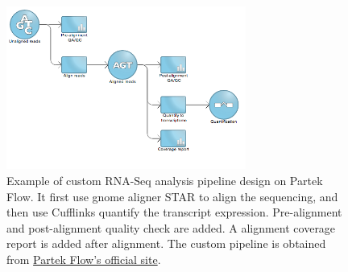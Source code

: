 \begin{figure}[!htbp]
\centering
\includegraphics[width=0.7\textwidth]{images/partek_flow_pipeline}
\caption[Example of custom pipeline design on Partek Flow]{
    Example of custom RNA-Seq analysis pipeline design on Partek Flow. It first
    use gnome aligner STAR to align the sequencing, and then use Cufflinks
    quantify the transcript expression. Pre-alignment and post-alignment
    quality check are added. A alignment coverage report is added after
    alignment. The custom pipeline is obtained from
    \href{http://www.partek.com/star-align-and-quantify}{Partek Flow's official site}.
}
\label{fig:partek-flow-pipeline}
\end{figure}


